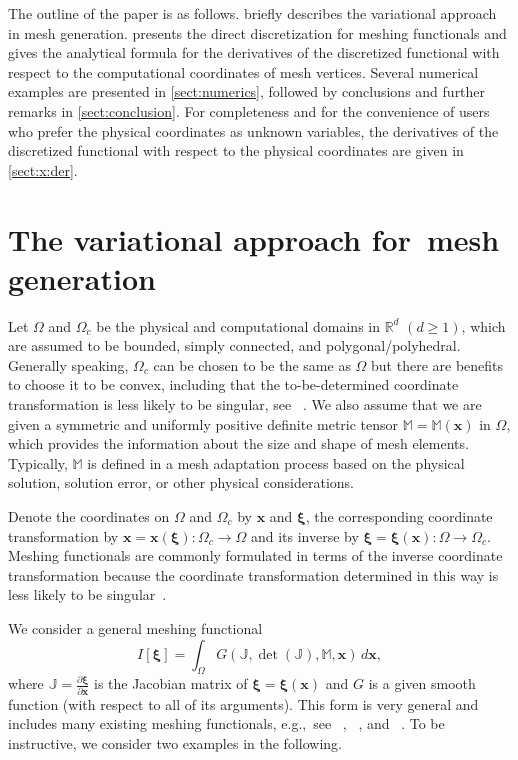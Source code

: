 \documentclass[american]{scrartcl}
\providecommand{\acite}[1]{\citeauthor{#1}~\cite{#1}}
\providecommand{\V}[1]{\boldsymbol{#1}}
\providecommand{\dx}{\,d\V{x}}
\providecommand{\p}[2]{\frac{\partial{}#1}{\partial{}#2}}
\providecommand{\M}{\mathbb{M}}
\providecommand{\J}{\mathbb{J}}
\providecommand{\R}{\mathbb{R}}
\theoremstyle{remark}
\begin{document}
The outline of the paper is as follows.
 briefly describes the variational approach in mesh generation.
 presents the direct discretization for meshing functionals and gives the analytical formula for the derivatives of the discretized functional with respect to the computational coordinates of mesh vertices.
Several numerical examples are presented in \cref{sect:numerics}, followed by conclusions and further remarks in \cref{sect:conclusion}.
For completeness and for the convenience of users who prefer the physical coordinates as unknown variables, the derivatives of the discretized functional with respect to the physical coordinates are given in \cref{sect:x:der}.

\section{The variational approach for~mesh generation}
\label{sect:mmpde}

Let $\Omega$ and $\Omega_c$ be the physical and computational domains in $\R^d$ $(d \ge 1)$, which are assumed to be bounded, simply connected, and polygonal/polyhedral.
Generally speaking, $\Omega_c$ can be chosen to be the same as $\Omega$ but there are benefits to choose it to be convex, including that the to-be-determined coordinate transformation is less likely to be singular, see \acite{Dvi91}. 
We also assume that we are given a symmetric and uniformly positive definite metric tensor $\M = \M(\V{x})$ in $\Omega$,
which provides the information about the size and shape of mesh elements.
Typically, $\M$ is defined in a mesh adaptation process based on the physical solution, solution error, or other physical considerations.

Denote the coordinates on $\Omega$ and $\Omega_c$ by $\V{x}$ and $\V{\xi}$, the corresponding coordinate transformation by $\V{x} = \V{x}(\V{\xi})\colon \Omega_c \to \Omega$ and its inverse by $\V{\xi} = \V{\xi}(\V{x})\colon \Omega \to \Omega_c$.
Meshing functionals are commonly formulated in terms of the inverse coordinate transformation because the coordinate transformation determined in this way is less likely to be singular~\cite{Dvi91}.

We consider a general meshing functional
\begin{equation}
   I[\V{\xi}] = \int_\Omega G \left (\J, \det(\J), \M, \V{x} \right) \dx,
   \label{eq:fun}
\end{equation}
where $\J = \p{\V{\xi}}{\V{x}}$ is the Jacobian matrix of $\V{\xi} = \V{\xi}(\V{x})$ and $G$ is a given smooth function (with respect to all of its arguments).
This form is very general and includes many existing meshing functionals, e.g.,\ see \acite{KS94}, \acite{Lis99}, and \acite{HR11}.
To be instructive, we consider two examples in the following.
\end{document}

